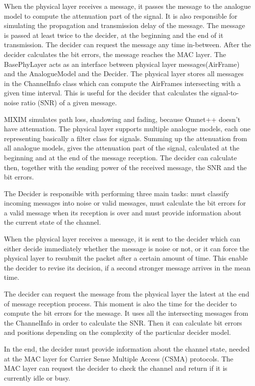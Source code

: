 When the physical layer receives a message, it passes the message to the
analogue model to compute the attenuation part of the signal. It is
also responsible for simulating the propagation and transmission delay of the
message. The message is passed at least twice to the decider, at the beginning
and the end of it transmission. The decider can request the message any time
in-between. After the decider calculates the bit errors, the message reaches the
MAC layer. The BasePhyLayer acts as an interface between physical layer
messages(AirFrame) and the AnalogueModel and the Decider. The physical layer
stores all messages in the ChannelInfo class which can compute the AirFrames
intersecting with a given time interval. This is useful for the decider that
calculates the signal-to-noise ratio (SNR) of a given message.

MIXIM simulates path loss, shadowing and fading, because Omnet++ doesn't have
attenuation. The physical layer supports multiple analogue models, each one
representing basically a filter class for signals. Summing up the attenuation
from all analogue models, gives the attenuation part of the signal, calculated
at the beginning and at the end of the message reception. The decider can
calculate then, together with the sending power of the received message, the SNR
and the bit errors.

The Decider is responsible with performing three main tasks: must classify
incoming messages into noise or valid messages, must calculate the bit errors
for a valid message when its reception is over and must provide information
about the current state of the channel.

When the physical layer receives a message, it is sent to the decider which can
either decide immediately whether the message is noise or not, or it can force
the physical layer to resubmit the packet after a certain amount of time. This
enable the decider to revise its decision, if a second stronger message arrives
in the mean time.

The decider can request the message from the physical layer the latest at the
end of message reception process. This moment is also the time for the decider
to compute the bit errors for the message. It uses all the intersecting
messages from the ChannelInfo in order to calculate the SNR. Then it can
calculate bit errors and positions depending on the complexity of the particular
decider model.

In the end, the decider must provide information about the channel state, needed
at the MAC layer for Carrier Sense Multiple Access (CSMA) protocols. The MAC
layer can request the decider to check the channel and return if it is currently
idle or busy.

